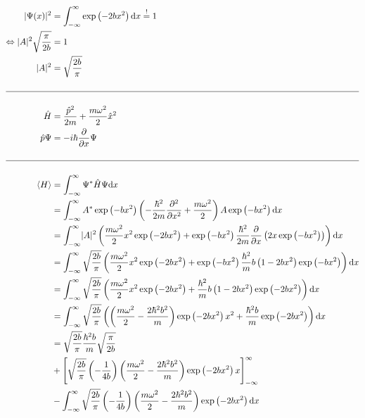     \begin{align*}
        \abs{\Psi(x)}^2 &= \int_{-\infty}^{\infty} \exp\left( -2bx^2 \right) \mathrm{d}x \stackrel{!}{=} 1\\
        \Leftrightarrow \abs{A}^2 \sqrt{\frac{\pi}{2b}} &= 1\\
        \abs{A}^2 &= \sqrt{\frac{2b}{\pi}}\\
        \\
        \hline\\
        \hat{H} &= \frac{\hat{p}^2}{2m} + \frac{m\omega^2}{2}\hat{x}^2\\
        \hat{p} \Psi &= -i\hbar \frac{\partial}{\partial x} \Psi\\
        \\
        \hline\\
        \langle H \rangle &= \int_{-\infty}^{\infty} \Psi^* \hat{H} \Psi \mathrm{d}x\\
        &= \int_{-\infty}^{\infty} A^* \exp\left( -bx^2 \right) \left( -\frac{\hbar^2}{2m} \frac{\partial^2}{\partial x^2} + \frac{m\omega^2}{2} \right) A \exp\left( -bx^2 \right) \mathrm{d}x\\
        &= \int_{-\infty}^{\infty} \abs{A}^2 \left( \frac{m\omega^2}{2} x^2 \exp\left( -2bx^2 \right) + \exp\left( -bx^2 \right) \frac{\hbar^2}{2m} \frac{\partial}{\partial x} \left( 2x \exp\left( -bx^2 \right) \right) \right) \mathrm{d}x\\
        &= \int_{-\infty}^{\infty} \sqrt{\frac{2b}{\pi}} \left( \frac{m\omega^2}{2} x^2 \exp\left( -2bx^2 \right) + \exp\left( -bx^2 \right) \frac{\hbar^2}{m} b \left( 1-2bx^2 \right) \exp\left( -bx^2 \right) \right) \mathrm{d}x\\
        &= \int_{-\infty}^{\infty} \sqrt{\frac{2b}{\pi}} \left( \frac{m\omega^2}{2} x^2 \exp\left( -2bx^2 \right) + \frac{\hbar^2}{m} b \left( 1-2bx^2 \right) \exp\left( -2bx^2 \right) \right) \mathrm{d}x\\
        &= \int_{-\infty}^{\infty} \sqrt{\frac{2b}{\pi}} \left( \left( \frac{m\omega^2}{2} - \frac{2\hbar^2 b^2}{m} \right) \exp\left( -2bx^2 \right) x^2 + \frac{\hbar^2 b}{m} \exp\left( -2bx^2 \right) \right) \mathrm{d}x\\
        &= \sqrt{\frac{2b}{\pi}} \frac{\hbar^2 b}{m} \sqrt{\frac{\pi}{2b}}\\
        &+ \left[ \sqrt{\frac{2b}{\pi}} \left( -\frac{1}{4b} \right) \left( \frac{m\omega^2}{2} - \frac{2\hbar^2 b^2}{m} \right) \exp\left( -2bx^2 \right) x \right]_{-\infty}^{\infty}\\
        &- \int_{-\infty}^{\infty} \sqrt{\frac{2b}{\pi}} \left( -\frac{1}{4b} \right) \left( \frac{m\omega^2}{2} - \frac{2\hbar^2 b^2}{m} \right) \exp\left( -2bx^2 \right) \mathrm{d}x\\

\end{align*}
